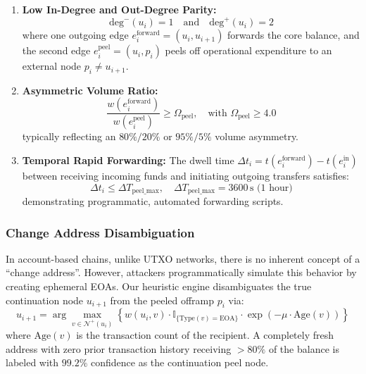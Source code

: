 \begin{enumerate}
    \item \textbf{Low In-Degree and Out-Degree Parity:}
    \begin{equation}
        \text{deg}^-(u_i) = 1 \quad \text{and} \quad \text{deg}^+(u_i) = 2
    \end{equation}
    where one outgoing edge $e_i^{\text{forward}} = (u_i, u_{i+1})$ forwards the core balance, and the second edge $e_i^{\text{peel}} = (u_i, p_i)$ peels off operational expenditure to an external node $p_i \ne u_{i+1}$.
    
    \item \textbf{Asymmetric Volume Ratio:}
    \begin{equation}
        \frac{w(e_i^{\text{forward}})}{w(e_i^{\text{peel}})} \ge \Omega_{\text{peel}}, \quad \text{with } \Omega_{\text{peel}} \ge 4.0
    \end{equation}
    typically reflecting an $80\% / 20\%$ or $95\% / 5\%$ volume asymmetry.
    
    \item \textbf{Temporal Rapid Forwarding:} The dwell time $\Delta t_i = t(e_i^{\text{forward}}) - t(e_i^{\text{in}})$ between receiving incoming funds and initiating outgoing transfers satisfies:
    \begin{equation}
        \Delta t_i \le \Delta T_{\text{peel\_max}}, \quad \Delta T_{\text{peel\_max}} = 3600\,\text{s (1 hour)}
    \end{equation}
    demonstrating programmatic, automated forwarding scripts.
\end{enumerate}

\subsubsection{Change Address Disambiguation}
In account-based chains, unlike UTXO networks, there is no inherent concept of a ``change address''. However, attackers programmatically simulate this behavior by creating ephemeral EOAs. Our heuristic engine disambiguates the true continuation node $u_{i+1}$ from the peeled offramp $p_i$ via:
\begin{equation}
    u_{i+1} = \arg\max_{v \in \mathcal{N}^+(u_i)} \left\{ w(u_i, v) \cdot \mathbb{I}_{\{\text{Type}(v) = \text{EOA}\}} \cdot \exp(-\mu \cdot \text{Age}(v)) \right\}
\end{equation}
where $\text{Age}(v)$ is the transaction count of the recipient. A completely fresh address with zero prior transaction history receiving $>80\%$ of the balance is labeled with $99.2\%$ confidence as the continuation peel node.

